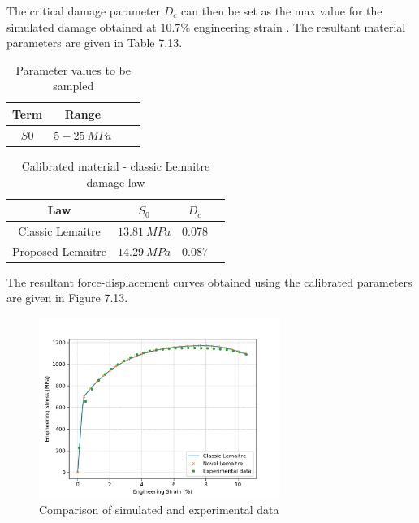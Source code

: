 \documentclass[sn-mathphys,Numbered,draft]{sn-jnl}%
\begin{document}
The critical damage parameter $D_c$ can then be set as the max value for the simulated damage obtained at $10.7 \%$ engineering strain \cite{malcher_continuum_2012}. The resultant material parameters are given in Table 7.13. 

\begin{table}[htb]
	\centering
		\begin{tabular}{cccc} \hline
			Term  & Range \\ \hline 
             $S0$ & $5-25\ MPa$ \\
			\hline
		\end{tabular}
	\caption{Parameter values to be sampled}
	\label{tab:material_properties}
\end{table}


\begin{table}[htb]
	\centering
		\begin{tabular}{cccc} \hline
			Law & $S_0$ &  $D_c$ \\ \hline 
             Classic Lemaitre & $13.81\ MPa$ & 0.078 \\
    		Proposed Lemaitre & $14.29\ MPa$ & 0.087   \\
			\hline
		\end{tabular}
	\caption{Calibrated material - classic Lemaitre damage law}
	\label{tab:material_properties}
\end{table}

The resultant force-displacement curves obtained using the calibrated parameters are given in Figure 7.13.

\begin{figure}[htb]
\begin{center}
	\includegraphics[width=0.7\textwidth]{./Figures/SimulationAndAnalysis/compareExperimentalSimulation/compareAllLemaitreExp.png}
\caption{Comparison of simulated and experimental data}
\label{fig:notchedRoundBAr}
\end{center}
\end{figure}
\end{document}
